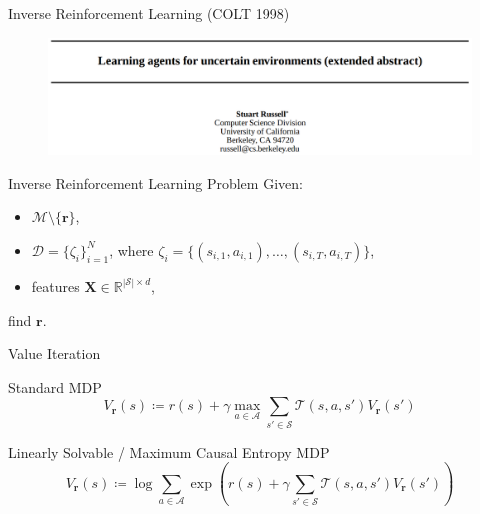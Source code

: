 \documentclass{beamer}
\begin{document}
\begin{frame}{Inverse Reinforcement Learning (COLT 1998)}
  \begin{figure}
    \centering
    \includegraphics[width=\textwidth]{russell.png}
  \end{figure}
  \begin{block}{Inverse Reinforcement Learning Problem}
    Given:
    \begin{itemize}
    \item $\mathcal{M} \setminus \{ \mathbf{r} \}$,
    \item $\mathcal{D} = \{ \zeta_i \}_{i=1}^N$, where $\zeta_i = \{ (s_{i,1},
      a_{i,1}), \dots, (s_{i,T}, a_{i,T}) \}$,
    \item features $\mathbf{X} \in \mathbb{R}^{|\mathcal{S}| \times d}$,
    \end{itemize}
    find $\mathbf{r}$.
  \end{block}
\end{frame} %

\begin{frame}{Value Iteration}
  \begin{block}{Standard MDP}
    \[
      V_{\mathbf{r}}(s) \coloneqq r(s) + \gamma \max_{a \in \mathcal{A}} \sum_{s' \in
        \mathcal{S}} \mathcal{T}(s, a, s')V_{\mathbf{r}}(s')
    \]
  \end{block}
  \begin{block}{Linearly Solvable / Maximum Causal Entropy MDP}
    \[
      V_{\mathbf{r}}(s) \coloneqq \log \sum_{a \in \mathcal{A}} \exp \left( r(s) +
        \gamma\sum_{s' \in \mathcal{S}} \mathcal{T}(s, a, s')V_{\mathbf{r}}(s')
      \right)
    \]
  \end{block}
\end{frame}
\end{document}
